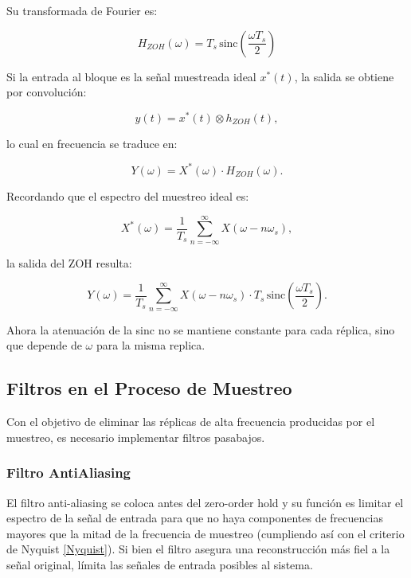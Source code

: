 Su transformada de Fourier es:

\begin{equation}
    H_{ZOH}(\omega) = T_s \, \text{sinc}\!\left(\frac{\omega T_s}{2}\right)
\end{equation}

\bigskip

Si la entrada al bloque es la señal muestreada ideal $x^*(t)$, la salida se obtiene por convolución:

\begin{equation}
    y(t) = x^*(t) \otimes h_{ZOH}(t),
\end{equation}

lo cual en frecuencia se traduce en:

\begin{equation}
    Y(\omega) = X^*(\omega) \cdot H_{ZOH}(\omega).
\end{equation}

Recordando que el espectro del muestreo ideal es:

\begin{equation}
    X^*(\omega) = \frac{1}{T_s} \sum_{n=-\infty}^{\infty} X(\omega - n\omega_s),
\end{equation}

la salida del ZOH resulta:

\begin{equation}
    Y(\omega) = \frac{1}{T_s} \sum_{n=-\infty}^{\infty} 
    X(\omega - n\omega_s) \cdot T_s \, \text{sinc}\!\left(\frac{\omega T_s}{2}\right).
\end{equation}

Ahora la atenuación de la sinc no se mantiene constante para cada réplica, 
sino que depende de $\omega$ para la misma replica.

\subsection{Filtros en el Proceso de Muestreo}
Con el objetivo de eliminar las réplicas de alta frecuencia producidas por el muestreo, es necesario implementar filtros pasabajos.
\subsubsection{Filtro AntiAliasing}
El filtro anti-aliasing se coloca antes del zero-order hold y su función es limitar el espectro de la señal de entrada para que no 
haya componentes de frecuencias mayores que la mitad de la frecuencia de muestreo (cumpliendo así con el criterio de Nyquist \ref{Nyquist}).
Si bien el filtro asegura una reconstrucción más fiel a la señal original, límita las señales de entrada posibles al sistema.
